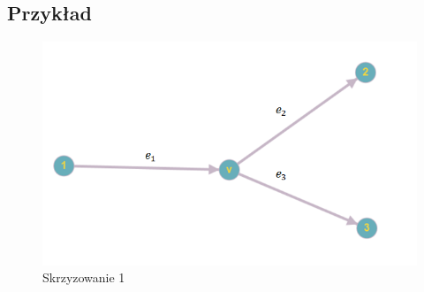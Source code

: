 \documentclass[12pt]{book}
\theoremstyle{plain}
\begin{document}
\subsection{Przykład}
\begin{figure}[H]
	\centering
	\includegraphics[width=14cm]{skrz_1}
	\caption{Skrzyzowanie 1}
	\label{fig:skrz_1}
\end{figure}
\end{document}
